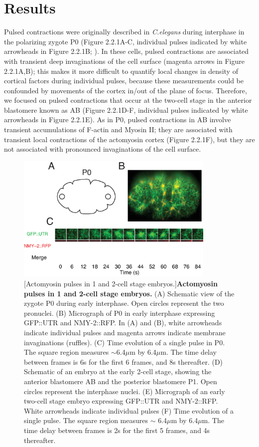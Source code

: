 \documentclass{ucetd}
\begin{document}
\section{Results}
Pulsed contractions were originally described in \textit{C.elegans} during interphase in the polarizing zygote P0 (Figure 2.2.1A-C, individual pulses indicated by white arrowheads in Figure 2.2.1B; \cite{Munro:2004jk}). In these cells, pulsed contractions are associated with transient deep invaginations of the cell surface (magenta arrows in Figure 2.2.1A,B); this makes it more difficult to quantify local changes in density of cortical factors during individual pulses, because these measurements could be confounded by movements of the cortex in/out of the plane of focus. Therefore, we focused on pulsed contractions that occur at the two-cell stage in the anterior blastomere known as AB (Figure 2.2.1D-F, individual pulses indicated by white arrowheads in Figure 2.2.1E).  As in P0, pulsed contractions in AB involve transient accumulations of F-actin and Myosin II; they are associated with transient local contractions of the actomyosin cortex (Figure 2.2.1F), but they are not associated with pronounced invaginations of the cell surface. 

\begin{figure}[!htbp]
\centering
\includegraphics[width=0.85\textwidth]{Figure2-1}
[Actomyosin pulses in 1 and 2-cell stage embryos.]{\textbf{Actomyosin pulses in 1 and 2-cell stage embryos.} (A) Schematic view of the zygote P0 during early interphase.  Open circles represent the two pronuclei. (B) Micrograph of P0 in early interphase expressing GFP::UTR and NMY-2::RFP. In (A) and (B), white arrowheads indicate individual pulses and magenta arrows indicate membrane invaginations (ruffles). (C) Time evolution of a single pulse in P0. The square region measures $\sim$6.4$\mu$m by 6.4$\mu$m.  The time delay between frames is 6s for the first 6 frames, and 8s thereafter. (D) Schematic of an embryo at the early 2-cell stage, showing the anterior blastomere AB and the posterior blastomere P1.  Open circles represent the interphase nuclei. (E) Micrograph of an early two-cell stage embryo expressing GFP::UTR and NMY-2::RFP. White arrowheads indicate individual pulses (F) Time evolution of a single pulse. The square region measures $\sim$ 6.4$\mu$m by 6.4$\mu$m.  The time delay between frames is 2s for the first 5 frames, and 4s thereafter.}
\end{figure}
\end{document}
